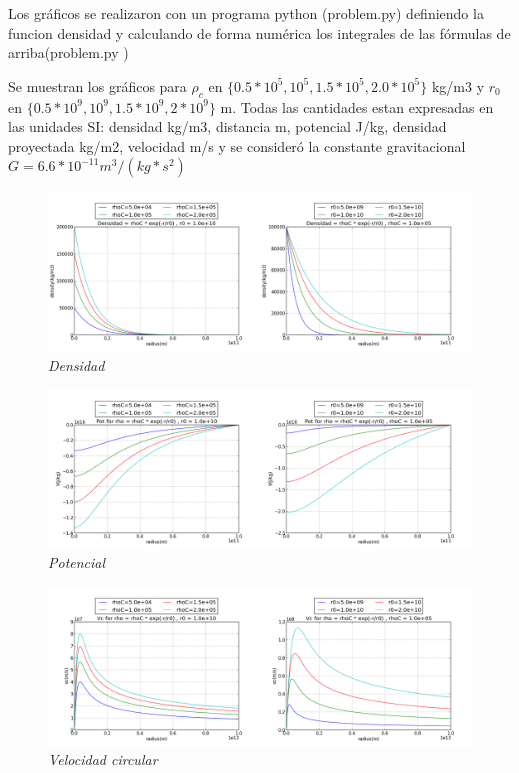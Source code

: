 \documentclass[12pt]{book}
\begin{document}
\begin{description}
\item Los gráficos se realizaron con un programa python (problem.py) definiendo la funcion densidad y calculando de forma numérica los integrales de las fórmulas de arriba(problem.py ) 
\item Se muestran los gráficos  para $\rho_c$ en $ \{0.5 * 10^5, 10^5, 1.5 * 10^5, 2.0 * 10^5 \}  $ kg/m3 y $r_0$ en $\{0.5 * 10^9, 10^9, 1.5 * 10^9 ,2 * 10^9 \} $ m. 
Todas las cantidades estan expresadas en las unidades SI: densidad kg/m3, distancia m, potencial J/kg, densidad proyectada kg/m2, velocidad m/s y se consideró la constante gravitacional $G = 6.6 * 10^{-11} m^3/(kg * s^2)$



\item

\begin{figure}[!ht]
 \centering
 \includegraphics[scale=0.33]{densFinal.png}
 \caption{\emph{Densidad}}
\end{figure}

\item

\begin{figure}[!ht]
 \centering
 \includegraphics[scale=0.33]{potFinal.png}
 \caption{\emph{Potencial}}
\end{figure}

\item

\begin{figure}[!ht]
 \centering
 \includegraphics[scale=0.33]{vcFinal.png}
 \caption{\emph{Velocidad circular}}
\end{figure}


\end{description}
\end{document}
